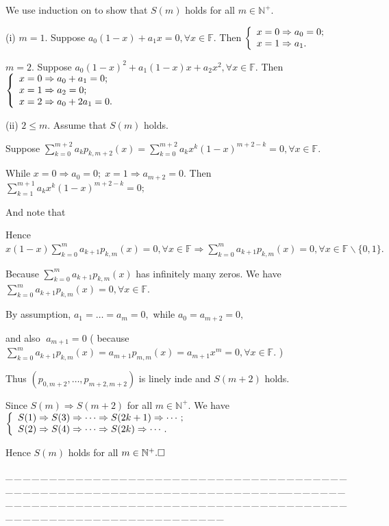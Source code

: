 \documentclass[a4paper, 11pt, UTF8]{article}
\def\Fbb{{\mathbb{F}}}
\def\Nbp{{\mathbb{N}^+}}
\def\Endi{\hspace{-2.5pt}}
\def\Hi{\quad\hspace{6.5pt}}
\def\Hii{\quad\hspace{7pt}}
\def\ProblemEnding{{\tiny \_\,\_\,\_\,\_\,\_\,\_\,\_\,\_\,\_\,\_\,\_\,\_\,\_\,\_\,\_\,\_\,\_\,\_\,\_\,\_\,\_\,\_\,\_\,\_\,\_\,\_\,\_\,\_\,\_\,\_\,\_\,\_\,\_\,\_\,\_\,\_\,\_\,\_\,\_\,\_\,\_\,\_\,\_\,\_\,\_\,\_\,\_\,\_\,\_\,\_\,\_\,\_\,\_\,\_\,\_\,\_\,\_\,\_\,\_\,\_\,\_\,\_\,\_\,\_\,\_\,\_\,\_\,\_\,\_\,\_\,\_\_\,\_\,\_\,\_\,\_\,\_\,\_\,\_\,\_\,\_\,\_\,\_\,\_\,\_\,\_\,\_\,\_\,\_\,\_\,\_\,\_\,\_\,\_\,\_\,\_\,\_\,\_\,\_\,\_\,\_\,\_\,\_\,\_\,\_\,\_\,\_\,\_\,\_\,\_\,\_\,\_\,\_\,\_\,\_\,\_\,\_\,\_\,\_\,\_\,\_\,\_\,\_\,\_\,\_\,\_\,\_\,\_\,\_\,\_\,\_\,\_\,\_\,\_\,\_\,\_\,\_\,\_\,\_\,\_\,\_\,\_}}
\begin{document}
\begin{large}
We use induction on to show that $S(m)$ holds for all $m\in\Nbp.$\par\quad
(i) $m=1.$ Suppose $a_0(1-x)+a_1x=0,\forall x\in\Fbb.$ Then $\MathLeftBrace{l}{x=0\Rightarrow a_0=0;\\x=1\Rightarrow a_1.}$\par\quad\Hi
$m=2.$ Suppose $a_0(1-x)^2+a_1(1-x)x+a_2x^2,\forall x\in\Fbb.$ Then $\MathLeftBrace{l}{x=0\Rightarrow a_0+a_1=0;\\x=1\Rightarrow a_2=0;\\x=2\Rightarrow a_0+2a_1=0.}$\par\vspace{6pt}\quad\Endi
(ii) $2\leq m.$ Assume that $S(m)$ holds.\par\quad\Hii
Suppose $\sum\limits_{k=0}^{m+2}a_kp_{k,m+2}(x)=\sum\limits_{k=0}^{m+2}a_kx^k(1-x)^{m+2-k}=0,\forall x\in\Fbb.$\par\quad\Hii
While $x=0\Rightarrow a_0=0;\;x=1\Rightarrow a_{m+2}=0.$ Then $\sum\limits_{k=1}^{m+1}a_kx^k(1-x)^{m+2-k}=0;$\vspace{12pt}\par\quad\Hii
And note that \vspace{-12pt}\vspace{10pt}\par\quad\Hii
Hence $x(1-x)\sum_{k=0}^{m}a_{k+1}p_{k,m}(x)=0,\forall x\in\Fbb\Rightarrow \sum_{k=0}^{m}a_{k+1}p_{k,m}(x)=0,\forall x\in\Fbb\backslash\{0,1\}.$\par\quad\Hii
Because $\sum_{k=0}^{m}a_{k+1}p_{k,m}(x)$ has infinitely many zeros. We have $\sum_{k=0}^{m}a_{k+1}p_{k,m}(x)=0,\forall x\in\Fbb.$\par\quad\Hii
By assumption, $a_1=\dots=a_m=0,$ while $a_0=a_{m+2}=0,$\par\quad\Hii
\hspace{34pt}and also $\;a_{m+1}=0$ ( because $\sum_{k=0}^{m}a_{k+1}p_{k,m}(x)=a_{m+1}p_{m,m}(x)=a_{m+1}x^m=0,\forall x\in\Fbb.$ )\par\quad\Hii
Thus $(p_{0,m+2},\dots,p_{m+2,m+2})$ is linely inde and $S(m+2)$ holds.\vspace{6pt}\par\quad
Since $S(m)\Rightarrow S(m+2)$ for all $m\in\Nbp.$ We have $\MathLeftBrace{l}{S(1)\Rightarrow S(3)\Rightarrow\cdots\Rightarrow S(2k+1)\Rightarrow \cdots;\\S(2)\Rightarrow S(4)\Rightarrow\cdots\Rightarrow S(2k)\Rightarrow\cdots.}$\par\quad
Hence $S(m)$ holds for all $m\in\Nbp.\hfill\square$\par
\ProblemEnding\par


\end{large}
\end{document}
